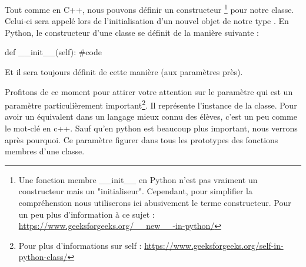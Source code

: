 \documentclass[12pt]{report}    %
\begin{document}
Tout comme en C++, nous pouvons définir un constructeur
\footnote
{
Une fonction membre \_\_init\_\_ en Python n'est pas vraiment un constructeur mais un "initialiseur". Cependant, pour simplifier la compréhension nous utiliserons ici abusivement le terme constructeur. Pour un peu plus d'information à ce sujet : \url{https://www.geeksforgeeks.org/__new__-in-python/}
}
pour notre classe. Celui-ci sera appelé lors de l'initialisation d'un nouvel objet de notre type .\newline
En Python, le constructeur d'une classe se définit de la manière suivante :
\begin{pyCode}
def __init__(self):
    #code
\end{pyCode}
Et il sera toujours définit de cette manière (aux paramètres près).\smallSkip

Profitons de ce moment pour attirer votre attention sur le paramètre \textcolor{red}{} qui est un paramètre particulièrement important\footnote{Pour plus d'informations sur self : \url{https://www.geeksforgeeks.org/self-in-python-class/}}. Il représente l'instance de la classe. Pour avoir un équivalent dans un langage mieux connu des élèves, c'est un peu comme le mot-clé  en c++. Sauf qu'en python \textcolor{red}{} est beaucoup plus important, nous verrons après pourquoi.\newline
Ce paramètre \textcolor{red}{} figurer dans tous les prototypes des fonctions membres d'une classe.\smallSkip
\end{document}
